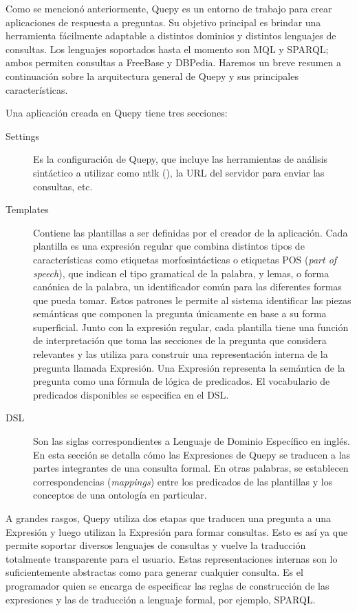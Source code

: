 Como se mencionó anteriormente, Quepy es un entorno de trabajo para crear aplicaciones de respuesta a preguntas. Su objetivo principal es brindar una herramienta fácilmente adaptable a distintos dominios y distintos lenguajes de consultas. Los lenguajes soportados hasta el momento son MQL y SPARQL; ambos permiten consultas a FreeBase y DBPedia. Haremos un breve resumen a continuación sobre la arquitectura general de Quepy y sus principales características.

Una aplicación creada en Quepy tiene tres secciones:
\begin{description}
    \item[Settings] Es la configuración de Quepy, que incluye las herramientas de análisis sintáctico a utilizar como ntlk (\citet{nltk}), la URL del servidor para enviar las consultas, etc.
    \item[Templates] Contiene las plantillas a ser definidas por el creador de la aplicación. Cada plantilla es una expresión regular que combina distintos tipos de características como etiquetas morfosintácticas o etiquetas POS (\textit{part of speech}), que indican el tipo gramatical de la palabra, y lemas, o forma canónica de la palabra, un identificador común para las diferentes formas que pueda tomar.  Estos patrones le permite al sistema identificar las piezas semánticas que componen la pregunta únicamente en base a su forma superficial. Junto con la expresión regular, cada plantilla tiene una función de interpretación que toma las secciones de la pregunta que considera relevantes y las utiliza para construir una representación interna de la pregunta llamada Expresión. Una Expresión representa la semántica de la pregunta como una fórmula de lógica de predicados. El vocabulario de predicados disponibles se especifica en el DSL.
    \item[DSL] Son las siglas correspondientes a Lenguaje de Dominio Específico en inglés. En esta sección se detalla cómo las Expresiones de Quepy se traducen a las partes integrantes de una consulta formal. En otras palabras, se establecen correspondencias (\textit{mappings}) entre los predicados de las plantillas y los conceptos de una ontología en particular.
\end{description}

A grandes rasgos, Quepy utiliza dos etapas que traducen una pregunta a una Expresión y luego utilizan la Expresión para formar consultas. Esto es así ya que permite soportar diversos lenguajes de consultas y vuelve la traducción totalmente transparente para el usuario. Estas representaciones internas son lo suficientemente abstractas como para generar cualquier consulta. Es el programador quien se encarga de especificar las reglas de construcción de las expresiones y las de traducción a lenguaje formal, por ejemplo, SPARQL.

